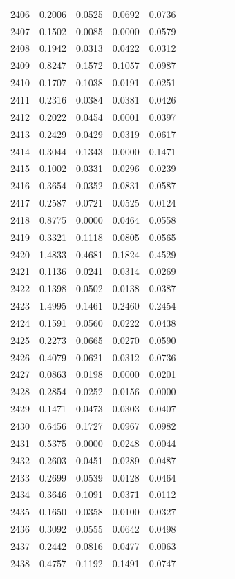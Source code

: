 \begin{table}
\begin{tabular}{cccccccccc}
2406& 0.2006& 0.0525& 0.0692& 0.0736\\ 
2407& 0.1502& 0.0085& 0.0000& 0.0579\\ 
2408& 0.1942& 0.0313& 0.0422& 0.0312\\ 
2409& 0.8247& 0.1572& 0.1057& 0.0987\\ 
2410& 0.1707& 0.1038& 0.0191& 0.0251\\ 
2411& 0.2316& 0.0384& 0.0381& 0.0426\\ 
2412& 0.2022& 0.0454& 0.0001& 0.0397\\ 
2413& 0.2429& 0.0429& 0.0319& 0.0617\\ 
2414& 0.3044& 0.1343& 0.0000& 0.1471\\ 
2415& 0.1002& 0.0331& 0.0296& 0.0239\\ 
2416& 0.3654& 0.0352& 0.0831& 0.0587\\ 
2417& 0.2587& 0.0721& 0.0525& 0.0124\\ 
2418& 0.8775& 0.0000& 0.0464& 0.0558\\ 
2419& 0.3321& 0.1118& 0.0805& 0.0565\\ 
2420& 1.4833& 0.4681& 0.1824& 0.4529\\ 
2421& 0.1136& 0.0241& 0.0314& 0.0269\\ 
2422& 0.1398& 0.0502& 0.0138& 0.0387\\ 
2423& 1.4995& 0.1461& 0.2460& 0.2454\\ 
2424& 0.1591& 0.0560& 0.0222& 0.0438\\ 
2425& 0.2273& 0.0665& 0.0270& 0.0590\\ 
2426& 0.4079& 0.0621& 0.0312& 0.0736\\ 
2427& 0.0863& 0.0198& 0.0000& 0.0201\\ 
2428& 0.2854& 0.0252& 0.0156& 0.0000\\ 
2429& 0.1471& 0.0473& 0.0303& 0.0407\\ 
2430& 0.6456& 0.1727& 0.0967& 0.0982\\ 
2431& 0.5375& 0.0000& 0.0248& 0.0044\\ 
2432& 0.2603& 0.0451& 0.0289& 0.0487\\ 
2433& 0.2699& 0.0539& 0.0128& 0.0464\\ 
2434& 0.3646& 0.1091& 0.0371& 0.0112\\ 
2435& 0.1650& 0.0358& 0.0100& 0.0327\\ 
2436& 0.3092& 0.0555& 0.0642& 0.0498\\ 
2437& 0.2442& 0.0816& 0.0477& 0.0063\\ 
2438& 0.4757& 0.1192& 0.1491& 0.0747\\ 

\end{tabular}
\end{table}
